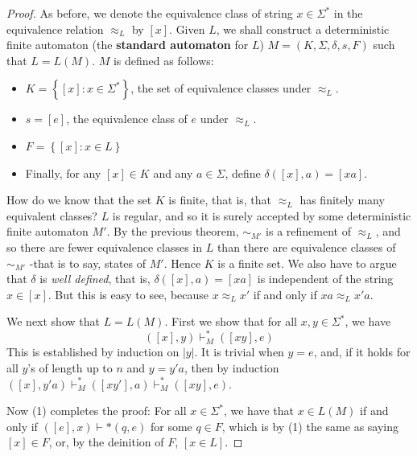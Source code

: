 \begin{multicols}{2}
\setlength{\columnsep}{1.5cm}
\setlength{\columnseprule}{0.2pt}
\begin{proof}
  As before, we denote the equivalence class of string $x \in \Sigma^*$ in the equivalence relation $\approx_L$ by $\left[x\right]$. Given $L$, we shall construct a deterministic finite automaton (the \textbf{standard automaton} for $L$) $M = (K, \Sigma, \delta, s, F)$ such that $L = L(M)$. $M$ is defined as follows:
  \begin{itemize}
    \item $K = \left\{ \left[x\right] : x \in \Sigma^*\right\}$, the set of equivalence classes under $\approx_L$.
    \item $s = \left[e\right]$, the equivalence class of $e$ under $\approx_L$.
    \item $F = \left\{ \left[ x \right] : x \in L \right\}$
    \item Finally, for any $\left[ x \right] \in K$ and any $a \in \Sigma$, define $\delta(\left[ x \right], a) = \left[ xa \right]$.
  \end{itemize}
  How do we know that the set $K$ is finite, that is, that $\approx_L$ has finitely many equivalent classes? $L$ is regular, and so it is surely accepted by some deterministic finite automaton $M'$. By the previous theorem, $\sim_{M'}$ is a refinement of $\approx_L$, and so there are fewer equivalence classes in $L$ than there are equivalence classes of $\sim_{M'}$ -that is to say, states of $M'$. Hence $K$ is a finite set. We also have to argue that $\delta$ is \textit{well defined}, that is, $\delta(\left[ x \right], a) = \left[ xa \right]$ is independent of the string $x \in \left[ x \right]$. But this is easy to see, because $x \approx_L x'$ if and only if $xa \approx_L x'a$.

  We next show that $L = L(M)$. First we show that for all $x, y \in \Sigma^*$, we have
  \begin{equation}
    \left( \left[ x \right], y \right) \vdash_M^* \left( \left[ xy \right], e \right)
  \end{equation}
  This is established by induction on $|y|$. It is trivial when $y = e$, and, if it holds for all $y$'s of length up to $n$ and $y = y'a$, then by induction $\left( \left[ x \right], y'a \right) \vdash_M^* \left( \left[ xy' \right], a \right) \vdash_M^* \left( \left[ xy \right], e \right)$.
  
  Now (1) completes the proof: For all $x \in \Sigma^*$, we have that $x \in L(M)$ if and only if $\left( \left[ e \right], x \right) \vdash *\left( q, e \right)$ for some $q \in F$, which is by (1) the same as saying $\left[ x \right] \in F$, or, by the deinition of $F$, $\left[ x \in L \right]$.
\end{proof}
\end{multicols}

